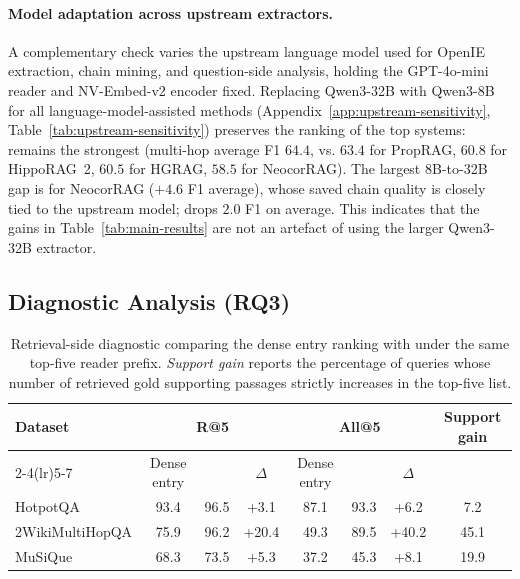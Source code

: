 \paragraph{Model adaptation across upstream extractors.}
A complementary check varies the upstream language model used for
OpenIE extraction, chain mining, and question-side analysis,
holding the GPT-4o-mini reader and NV-Embed-v2 encoder fixed.
Replacing Qwen3-32B with Qwen3-8B for all language-model-assisted
methods (Appendix~\ref{app:upstream-sensitivity},
Table~\ref{tab:upstream-sensitivity}) preserves the ranking of the
top systems: \methodname{} remains the strongest (multi-hop
average F1 $64.4$, vs. $63.4$ for PropRAG, $60.8$ for HippoRAG~2,
$60.5$ for HGRAG, $58.5$ for NeocorRAG). The largest 8B-to-32B gap
is for NeocorRAG ($+4.6$ F1 average), whose saved chain quality is
closely tied to the upstream model; \methodname{} drops $2.0$ F1
on average. This indicates that the gains in
Table~\ref{tab:main-results} are not an artefact of using the
larger Qwen3-32B extractor.

\subsection{Diagnostic Analysis (RQ3)}
\label{sec:experiments:analysis}

\begin{table}[t]
\centering
\small
\setlength{\tabcolsep}{4pt}
\begin{tabular}{lccc ccc c}
\toprule
Dataset & \multicolumn{3}{c}{R@5} &
\multicolumn{3}{c}{All@5} &
Support gain \\
\cmidrule(lr){2-4}\cmidrule(lr){5-7}
& Dense entry & \methodname{} & $\Delta$ &
Dense entry & \methodname{} & $\Delta$ & \\
\midrule
HotpotQA & 93.4 & 96.5 & +3.1 & 87.1 & 93.3 & +6.2 & 7.2 \\
2WikiMultiHopQA & 75.9 & 96.2 & +20.4 & 49.3 & 89.5 & +40.2 & 45.1 \\
MuSiQue & 68.3 & 73.5 & +5.3 & 37.2 & 45.3 & +8.1 & 19.9 \\
\bottomrule
\end{tabular}
\caption{Retrieval-side diagnostic comparing the dense entry ranking
with \methodname{} under the same top-five reader prefix.
\emph{Support gain} reports the percentage of queries whose number of
retrieved gold supporting passages strictly increases in the top-five
list.}
\label{tab:flow-diagnostic}
\end{table}

